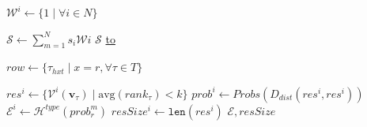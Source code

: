 \documentclass{article}
\begin{document}
\begin{algorithm}[!htb]
\begin{algorithmic}[1]
            \vspace{3pt}
            \State $\mathcal{W}^i \leftarrow \{1\;|\; \forall i \in N\}$
            \vspace{3pt}
        \EndIf
            
        \vspace{3pt}
        \State $\mathcal{S} \leftarrow \sum_{m=1}^{N} s\acute{}_i \mathcal{W}i$
        \Statex
        \State \Return $\mathcal{S}$
        \Statex \hrulefill
        \Statex \noindent\underline{\hbox to }

            \State $row \leftarrow \{\tau_{hxt}\;|\; x=r, \forall \tau \in T\}$
        
                \vspace{3pt}
                \State $res^{i} \leftarrow \{\mathcal{V}^i(\mathbf{v}_{\tau})\;|\;\mathrm{avg}(rank_{\tau}) <k \}$
                \vspace{3pt}
                \State $prob^{i} \leftarrow Probs(D_{\mathit{dist}}(res^{i}, res^{i}))$
                \vspace{3pt}
                \State $\mathcal{E}^{i} \leftarrow \mathcal{H}^{\mathit{type}}(prob_r^m)$
                \vspace{3pt}
                \State $resSize^{i} \leftarrow \mathtt{len}(res^{i})$  
                \vspace{3pt}
            \EndFor
            \vspace{3pt}
            \State \Return $\mathcal{E}, resSize$
            
        \EndFunction
    \end{algorithmic}
\end{algorithm}





\end{document}
